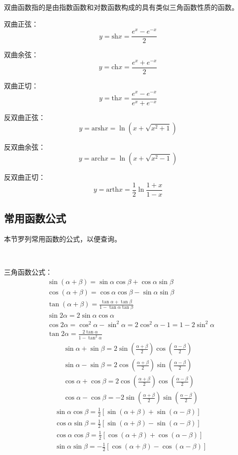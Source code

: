 双曲函数指的是由指数函数和对数函数构成的具有类似三角函数性质的函数。

双曲正弦：
\[
y=\mathrm{sh}x=\frac{e^x-e^{-x}}{2}
\]

双曲余弦：
\[
y=\mathrm{ch}x=\frac{e^x+e^{-x}}{2}
\]

双曲正切：
\[
y=\mathrm{th}x=\frac{e^x-e^{-x}}{e^x+e^{-x}}
\]

反双曲正弦：
\[
y=\mathrm{arsh}x=\ln \left( x+\sqrt{x^2+1} \right)
\]

反双曲余弦：
\[
y=\mathrm{arch}x=\ln \left( x+\sqrt{x^2-1} \right)
\]

反双曲正切：
\[
y=\mathrm{arth}x=\frac{1}{2}\ln \frac{1+x}{1-x}
\]

\subsection{常用函数公式}

本节罗列常用函数的公式，以便查询。

~

三角函数公式：
\begin{align*}
&\sin \left( \alpha +\beta \right) =\sin \alpha \cos \beta +\cos \alpha \sin \beta \\
&\cos \left( \alpha +\beta \right) =\cos \alpha \cos \beta -\sin \alpha \sin \beta \\
&\tan \left( \alpha +\beta \right) =\frac{\tan \alpha +\tan \beta}{1-\tan \alpha \tan \beta} \\
&\sin 2\alpha =2\sin \alpha \cos \alpha \\
&\cos 2\alpha =\cos ^2\alpha -\sin ^2\alpha =2\cos ^2\alpha -1=1-2\sin ^2\alpha \\
&\tan 2\alpha =\frac{2\tan \alpha}{1-\tan ^2\alpha}
\end{align*}
\begin{align*}
&\sin \alpha +\sin \beta =2\sin \left( \frac{\alpha +\beta}{2} \right) \cos \left( \frac{\alpha -\beta}{2} \right) \\
&\sin \alpha -\sin \beta =2\cos \left( \frac{\alpha +\beta}{2} \right) \sin \left( \frac{\alpha -\beta}{2} \right) \\
&\cos \alpha +\cos \beta =2\cos \left( \frac{\alpha +\beta}{2} \right) \cos \left( \frac{\alpha -\beta}{2} \right) \\
&\cos \alpha -\cos \beta =-2\sin \left( \frac{\alpha +\beta}{2} \right) \sin \left( \frac{\alpha -\beta}{2} \right)
\end{align*}
\begin{align*}
&\sin \alpha \cos \beta =\frac{1}{2}\left[ \sin \left( \alpha +\beta \right) +\sin \left( \alpha -\beta \right) \right] \\
&\cos \alpha \sin \beta =\frac{1}{2}\left[ \sin \left( \alpha +\beta \right) -\sin \left( \alpha -\beta \right) \right] \\
&\cos \alpha \cos \beta =\frac{1}{2}\left[ \cos \left( \alpha +\beta \right) +\cos \left( \alpha -\beta \right) \right] \\
&\sin \alpha \sin \beta =-\frac{1}{2}\left[ \cos \left( \alpha +\beta \right) -\cos \left( \alpha -\beta \right) \right]
\end{align*}

